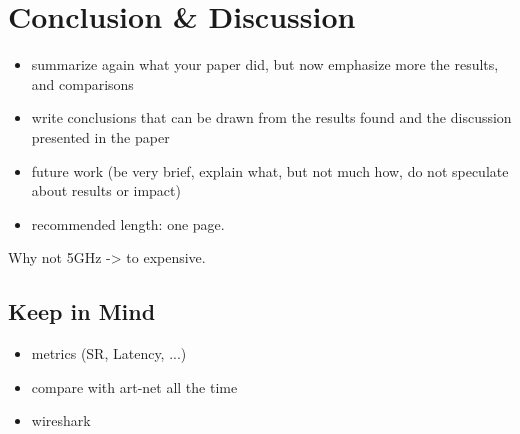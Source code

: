 \chapter{Conclusion \& Discussion}
\begin{itemize}
\item summarize again what your paper did, but now emphasize more the results, and comparisons
\item write conclusions that can be drawn from the results found and the discussion presented in the paper
\item future work (be very brief, explain what, but not much how, do not speculate about results or impact)
\item recommended length: one page.
\end{itemize}

Why not 5GHz -> to expensive.\\


\section*{Keep in Mind}
\begin{itemize}
\item metrics (SR, Latency, ...)
\item compare with art-net all the time
\item wireshark
\end{itemize}